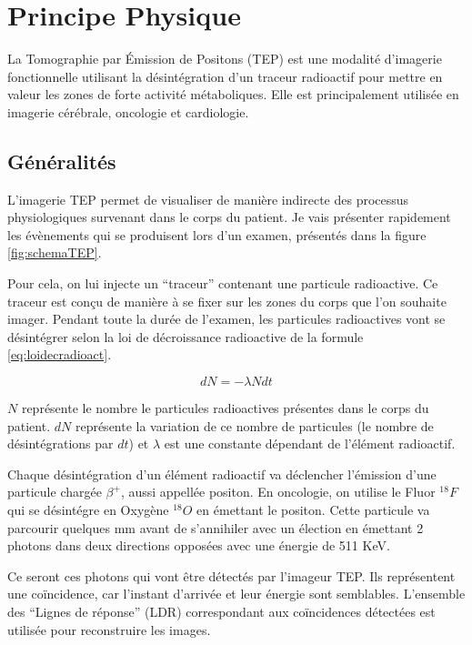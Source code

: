 
\chapter{Principe Physique}

\label{lab:chapPET}
La Tomographie par \'Emission de Positons (TEP) est une modalité d'imagerie fonctionnelle utilisant la désintégration d'un traceur radioactif pour mettre en valeur les zones de forte activité métaboliques. Elle est principalement utilisée en imagerie cérébrale, oncologie et cardiologie.


	\section{Généralités}

L'imagerie TEP permet de visualiser de manière indirecte des processus physiologiques survenant dans le corps du patient. Je vais présenter rapidement les évènements qui se produisent lors d'un examen, présentés dans la figure \ref{fig:schemaTEP}.

Pour cela, on lui injecte un ``traceur'' contenant une particule radioactive. Ce traceur est conçu de manière à se fixer sur les zones du corps que l'on souhaite imager. Pendant toute la durée de l'examen, les particules radioactives vont se désintégrer selon la loi de décroissance radioactive de la formule \ref{eq:loidecradioact}.

\begin{equation}
	dN = - \lambda N dt
	\label{eq:loidecradioact}
\end{equation}

$N$ représente le nombre le particules radioactives présentes dans le corps du patient. $dN$ représente la variation de ce nombre de particules (le nombre de désintégrations par $dt$) et $\lambda$ est une constante dépendant de l'élément radioactif.

Chaque désintégration d'un élément radioactif va déclencher l'émission d'une particule chargée $\beta^+$, aussi appellée positon. En oncologie, on utilise le Fluor $^{18}F$ qui se désintégre en Oxygène $^{18}O$ en émettant le positon. Cette particule va parcourir quelques mm avant de s'annihiler avec un élection en émettant 2 photons dans deux directions opposées avec une énergie de 511 KeV.

Ce seront ces photons qui vont être détectés par l'imageur TEP. Ils représentent une coïncidence, car l'instant d'arrivée et leur énergie sont semblables. L'ensemble des ``Lignes de réponse'' (LDR) correspondant aux coïncidences détectées est utilisée pour reconstruire les images.

